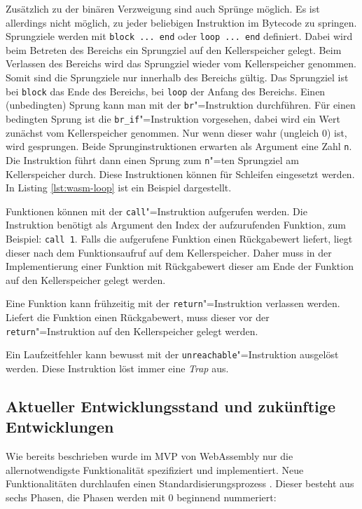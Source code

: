 Zusätzlich zu der binären Verzweigung sind auch Sprünge möglich. Es ist allerdings nicht möglich, zu jeder beliebigen Instruktion im Bytecode zu springen. Sprungziele werden mit \lstinline{block ... end} oder \lstinline{loop ... end} definiert. Dabei wird beim Betreten des Bereichs ein Sprungziel auf den Kellerspeicher gelegt. Beim Verlassen des Bereichs wird das Sprungziel wieder vom Kellerspeicher genommen. Somit sind die Sprungziele nur innerhalb des Bereichs gültig. Das Sprungziel ist bei \lstinline{block} das Ende des Bereichs, bei \lstinline{loop} der Anfang des Bereichs. Einen (unbedingten) Sprung kann man mit der \lstinline{br}"=Instruktion durchführen. Für einen bedingten Sprung ist die \lstinline{br_if}"=Instruktion vorgesehen, dabei wird ein Wert zunächst vom Kellerspeicher genommen. Nur wenn dieser wahr (ungleich 0) ist, wird gesprungen. Beide Sprunginstruktionen erwarten als Argument eine Zahl \lstinline{n}. Die Instruktion führt dann einen Sprung zum \lstinline{n}"=ten Sprungziel am Kellerspeicher durch. Diese Instruktionen können für Schleifen eingesetzt werden. In Listing \ref{lst:wasm-loop} ist ein Beispiel dargestellt.



Funktionen können mit der \lstinline{call}"=Instruktion aufgerufen werden. Die Instruktion benötigt als Argument den Index der aufzurufenden Funktion, zum Beispiel: \lstinline{call 1}. Falls die aufgerufene Funktion einen Rückgabewert liefert, liegt dieser nach dem Funktionsaufruf auf dem Kellerspeicher. Daher muss in der Implementierung einer Funktion mit Rückgabewert dieser am Ende der Funktion auf den Kellerspeicher gelegt werden.

Eine Funktion kann frühzeitig mit der \lstinline{return}"=Instruktion verlassen werden. Liefert die Funktion einen Rückgabewert, muss dieser vor der \lstinline{return}"=Instruktion auf den Kellerspeicher gelegt werden.

Ein Laufzeitfehler kann bewusst mit der \lstinline{unreachable}"=Instruktion ausgelöst werden. Diese Instruktion löst immer eine \emph{Trap} aus.

\subsection{Aktueller Entwicklungsstand und zukünftige Entwicklungen}
Wie bereits beschrieben wurde im MVP von WebAssembly nur die allernotwendigste Funktionalität spezifiziert und implementiert. Neue Funktionalitäten durchlaufen einen Standardisierungsprozess \cite{WebAssemblyW3CProcess}. Dieser besteht aus sechs Phasen, die Phasen werden mit 0 beginnend nummeriert:

